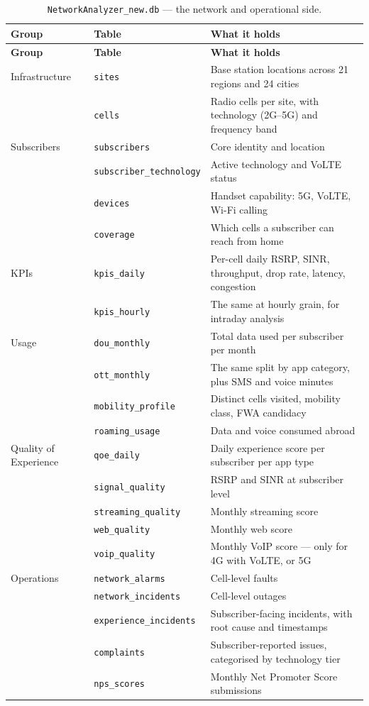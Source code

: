 \begin{longtable}{@{}p{2.1cm}p{3.5cm}p{8.2cm}@{}}
\caption{\texttt{NetworkAnalyzer\_new.db} --- the network and operational
side.}\label{tab:schema-network}\\
\toprule
\textbf{Group} & \textbf{Table} & \textbf{What it holds} \\
\midrule
\endfirsthead
\toprule
\textbf{Group} & \textbf{Table} & \textbf{What it holds} \\
\midrule
\endhead
Infrastructure & \texttt{sites} & Base station locations across 21 regions and 24 cities \\
 & \texttt{cells} & Radio cells per site, with technology (2G--5G) and frequency band \\
\addlinespace
Subscribers & \texttt{subscribers} & Core identity and location \\
 & \texttt{subscriber\_technology} & Active technology and VoLTE status \\
 & \texttt{devices} & Handset capability: 5G, VoLTE, Wi-Fi calling \\
 & \texttt{coverage} & Which cells a subscriber can reach from home \\
\addlinespace
KPIs & \texttt{kpis\_daily} & Per-cell daily RSRP, SINR, throughput, drop rate, latency, congestion \\
 & \texttt{kpis\_hourly} & The same at hourly grain, for intraday analysis \\
\addlinespace
Usage & \texttt{dou\_monthly} & Total data used per subscriber per month \\
 & \texttt{ott\_monthly} & The same split by app category, plus SMS and voice minutes \\
 & \texttt{mobility\_profile} & Distinct cells visited, mobility class, FWA candidacy \\
 & \texttt{roaming\_usage} & Data and voice consumed abroad \\
\addlinespace
Quality of Experience & \texttt{qoe\_daily} & Daily experience score per subscriber per app type \\
 & \texttt{signal\_quality} & RSRP and SINR at subscriber level \\
 & \texttt{streaming\_quality} & Monthly streaming score \\
 & \texttt{web\_quality} & Monthly web score \\
 & \texttt{voip\_quality} & Monthly VoIP score --- only for 4G with VoLTE, or 5G \\
\addlinespace
Operations & \texttt{network\_alarms} & Cell-level faults \\
 & \texttt{network\_incidents} & Cell-level outages \\
 & \texttt{experience\_incidents} & Subscriber-facing incidents, with root cause and timestamps \\
 & \texttt{complaints} & Subscriber-reported issues, categorised by technology tier \\
 & \texttt{nps\_scores} & Monthly Net Promoter Score submissions \\
\bottomrule
\end{longtable}

